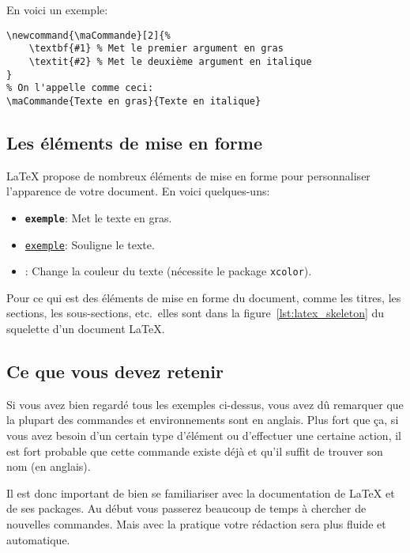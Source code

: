 En voici un exemple:
\begin{verbatim}
\newcommand{\maCommande}[2]{%
    \textbf{#1} % Met le premier argument en gras
    \textit{#2} % Met le deuxième argument en italique
}
% On l'appelle comme ceci:
\maCommande{Texte en gras}{Texte en italique}
\end{verbatim}

\subsection{Les éléments de mise en forme}\label{subsec:latex_formatting}
LaTeX propose de nombreux éléments de mise en forme pour personnaliser l'apparence de votre document.
En voici quelques-uns:
\begin{itemize}
    \item \texttt{\textbf{exemple}}: Met le texte en gras.
    \item \texttt{\underline{exemple}}: Souligne le texte.
    \item \texttt{\color{red}{exemple}}: Change la couleur du texte (nécessite le package \texttt{xcolor}).
\end{itemize}

Pour ce qui est des éléments de mise en forme du document, comme
les titres, les sections, les sous-sections, etc.\ elles
sont dans la figure~\ref{lst:latex_skeleton} du squelette d'un document LaTeX.

\subsection{Ce que vous devez retenir}\label{subsec:latex_what_to_remember}

Si vous avez bien regardé tous les exemples ci-dessus, vous avez dû remarquer que
la plupart des commandes et environnements sont en anglais. Plus fort que ça,
si vous avez besoin d'un certain type d'élément ou d'effectuer une certaine action,
il est fort probable que cette commande existe déjà et qu'il suffit de trouver son nom (en anglais).

Il est donc important de bien se familiariser avec la documentation de LaTeX et de ses packages.
Au début vous passerez beaucoup de temps à chercher de nouvelles commandes. 
Mais avec la pratique votre rédaction sera plus fluide et automatique.